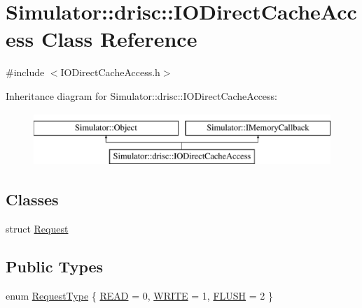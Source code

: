 \hypertarget{class_simulator_1_1drisc_1_1_i_o_direct_cache_access}{\section{Simulator\+:\+:drisc\+:\+:I\+O\+Direct\+Cache\+Access Class Reference}
\label{class_simulator_1_1drisc_1_1_i_o_direct_cache_access}
}


{\ttfamily \#include $<$I\+O\+Direct\+Cache\+Access.\+h$>$}

Inheritance diagram for Simulator\+:\+:drisc\+:\+:I\+O\+Direct\+Cache\+Access\+:\begin{figure}[H]
\begin{center}
\leavevmode
\includegraphics[height=2.000000cm]{class_simulator_1_1drisc_1_1_i_o_direct_cache_access}
\end{center}
\end{figure}
\subsection*{Classes}
\begin{DoxyCompactItemize}
\item 
struct \hyperlink{struct_simulator_1_1drisc_1_1_i_o_direct_cache_access_1_1_request}{Request}
\end{DoxyCompactItemize}
\subsection*{Public Types}
\begin{DoxyCompactItemize}
\item 
enum \hyperlink{class_simulator_1_1drisc_1_1_i_o_direct_cache_access_ab3755016dcd264261b50c8e4aa274c1c}{Request\+Type} \{ \hyperlink{class_simulator_1_1drisc_1_1_i_o_direct_cache_access_ab3755016dcd264261b50c8e4aa274c1ca983c45444bd50bd3c80127bb1befa542}{R\+E\+A\+D} = 0, 
\hyperlink{class_simulator_1_1drisc_1_1_i_o_direct_cache_access_ab3755016dcd264261b50c8e4aa274c1caccc342ce9aad58e07881a8f4cc2a863b}{W\+R\+I\+T\+E} = 1, 
\hyperlink{class_simulator_1_1drisc_1_1_i_o_direct_cache_access_ab3755016dcd264261b50c8e4aa274c1caece0be0d04edefa0ccca19766457736b}{F\+L\+U\+S\+H} = 2
 \}
\end{DoxyCompactItemize}
